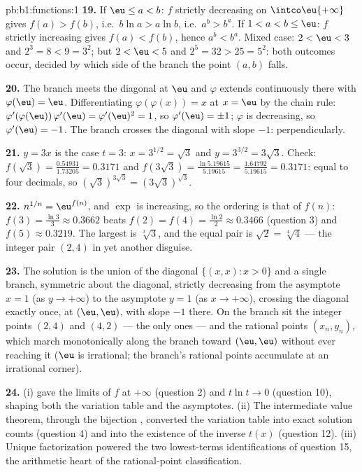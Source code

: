 \begin{solution}{pb:b1:functions:1}
\textbf{19.} If $\eu \leq a < b$: $f$ strictly decreasing on
$\intco\eu{+\infty}$ gives $f(a) > f(b)$, i.e.\ $b\ln a > a\ln
b$, i.e.\ $a^b > b^a$. If $1 < a < b \leq \eu$: $f$ strictly
increasing gives $f(a) < f(b)$, hence $a^b < b^a$. Mixed case:
$2 < \eu < 3$ and $2^3 = 8 < 9 = 3^2$; but $2 < \eu < 5$ and
$2^5 = 32 > 25 = 5^2$: both outcomes occur, decided by which side
of the branch the point $(a, b)$ falls.

\textbf{20.} The branch meets the diagonal at $\eu$ and $\varphi$
extends continuously there with $\varphi(\eu) = \eu$.
Differentiating $\varphi(\varphi(x)) = x$ at $x = \eu$ by the
chain rule: $\varphi'(\varphi(\eu))\,\varphi'(\eu) =
\varphi'(\eu)^2 = 1$, so $\varphi'(\eu) = \pm1$; $\varphi$ is
decreasing, so $\varphi'(\eu) = -1$. The branch crosses the
diagonal with slope $-1$: perpendicularly.

\textbf{21.} $y = 3x$ is the case $t = 3$: $x = 3^{1/2} = \sqrt3$
and $y = 3^{3/2} = 3\sqrt3$. Check: $f(\sqrt3) =
\frac{0.54931}{1.73205} = 0.3171$ and $f(3\sqrt3) =
\frac{\ln 5.19615}{5.19615} = \frac{1.64792}{5.19615} = 0.3171$:
equal to four decimals, so $(\sqrt3)^{3\sqrt3} =
(3\sqrt3)^{\sqrt3}$.

\textbf{22.} $n^{1/n} = \eu^{f(n)}$, and $\exp$ is increasing, so
the ordering is that of $f(n)$: $f(3) = \frac{\ln3}3 \approx
0.3662$ beats $f(2) = f(4) = \frac{\ln2}2 \approx 0.3466$ (question
3) and $f(5) \approx 0.3219$. The largest is $\sqrt[3]3$, and the
equal pair is $\sqrt2 = \sqrt[4]4$ --- the integer pair $(2, 4)$
in yet another disguise.

\textbf{23.} The solution  is the union of the diagonal $\{(x,
x) : x > 0\}$ and a single branch, symmetric about the diagonal,
strictly decreasing from the asymptote $x = 1$ (as $y \to
+\infty$) to the asymptote $y = 1$ (as $x \to +\infty$), crossing
the diagonal exactly once, at $(\eu, \eu)$, with slope $-1$
there. On the branch sit the integer points $(2, 4)$ and $(4, 2)$
--- the only ones --- and the rational points $(x_n, y_n)$,
which march monotonically along the branch toward $(\eu, \eu)$
without ever reaching it ($\eu$ is irrational; the branch's
rational points accumulate at an irrational corner).

\textbf{24.} (i)  gave the limits of $f$ at
$+\infty$ (question 2) and $t\ln t \to 0$ (question 10),
shaping both the variation table and the asymptotes. (ii) The
intermediate value theorem, through the bijection ,
converted the variation table into exact solution counts
(question 4) and into the existence of the inverse  $t(x)$
(question 12). (iii) Unique factorization powered the two
lowest-terms identifications of question 15, the arithmetic heart
of the rational-point classification.


\end{solution}

